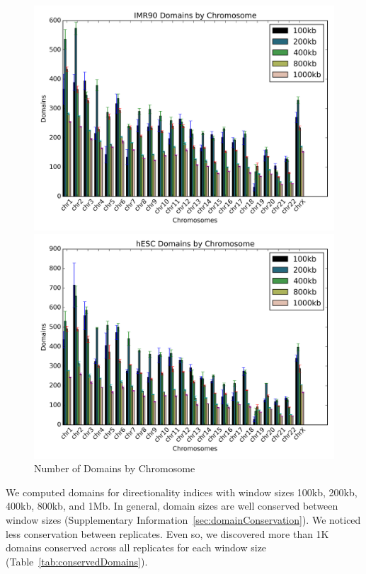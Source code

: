 \begin{figure}[H]
  \caption{Number of Domains by Chromosome}
  \begin{minipage}{0.45\textwidth}%
    \includegraphics[width=\textwidth]{./figures/results/domain_imr90_bar.png}
  \end{minipage}%
  \hfill
  \begin{minipage}{0.45\textwidth}
    \includegraphics[width=\textwidth]{./figures/results/domain_hesc_bar.png}
  \end{minipage}
\end{figure}

We computed domains for directionality indices with window sizes 100kb, 200kb, 400kb, 800kb, and 1Mb.  In general, domain sizes are well conserved
between window sizes (Supplementary Information~\ref{sec:domainConservation}).  We noticed less conservation between replicates.  Even so,
we discovered more than 1K domains conserved across all replicates for each window size (Table~\ref{tab:conservedDomains}).

